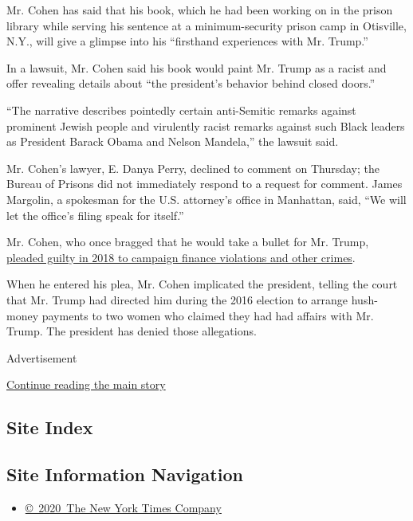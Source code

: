 Mr. Cohen has said that his book, which he had been working on in the
prison library while serving his sentence at a minimum-security prison
camp in Otisville, N.Y., will give a glimpse into his ``firsthand
experiences with Mr. Trump.''

In a lawsuit, Mr. Cohen said his book would paint Mr. Trump as a racist
and offer revealing details about ``the president's behavior behind
closed doors.''

``The narrative describes pointedly certain anti-Semitic remarks against
prominent Jewish people and virulently racist remarks against such Black
leaders as President Barack Obama and Nelson Mandela,'' the lawsuit
said.

Mr. Cohen's lawyer, E. Danya Perry, declined to comment on Thursday; the
Bureau of Prisons did not immediately respond to a request for comment.
James Margolin, a spokesman for the U.S. attorney's office in Manhattan,
said, ``We will let the office's filing speak for itself.''

Mr. Cohen, who once bragged that he would take a bullet for Mr. Trump,
\href{https://slack-redir.net/link?url=https\%3A\%2F\%2Fwww.nytimes3xbfgragh.onion\%2F2018\%2F08\%2F21\%2Fnyregion\%2Fmichael-cohen-guilty-plea-trump-takeaways.html}{pleaded
guilty in 2018 to campaign finance violations and other crimes}.

When he entered his plea, Mr. Cohen implicated the president, telling
the court that Mr. Trump had directed him during the 2016 election to
arrange hush-money payments to two women who claimed they had had
affairs with Mr. Trump. The president has denied those allegations.

Advertisement

\protect\hyperlink{after-bottom}{Continue reading the main story}

\hypertarget{site-index}{%
\subsection{Site Index}\label{site-index}}

\hypertarget{site-information-navigation}{%
\subsection{Site Information
Navigation}\label{site-information-navigation}}

\begin{itemize}
\tightlist
\item
  \href{https://help.nytimes3xbfgragh.onion/hc/en-us/articles/115014792127-Copyright-notice}{©~2020~The
  New York Times Company}
\end{itemize}


